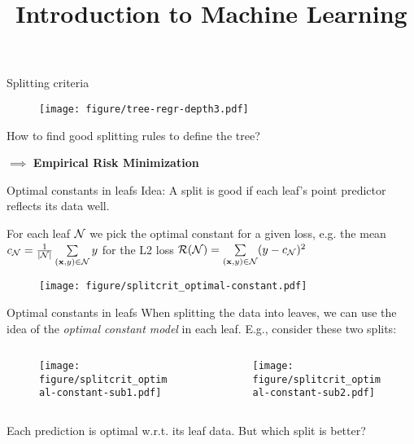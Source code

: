 \documentclass[11pt,compress,t,notes=noshow, xcolor=table]{beamer}
\title{Introduction to Machine Learning}
\institute{\href{https://compstat-lmu.github.io/lecture_i2ml/}{compstat-lmu.github.io/lecture\_i2ml}}
\date{}
\begin{document}
\sloppy


\begin{frame}{Splitting criteria}

 \begin{figure}
    \centering
      \texttt{[image: figure/tree-regr-depth3.pdf]}
    \end{figure}

How to find good splitting rules to define the tree?
\lz

$\implies$ \textbf{Empirical Risk Minimization}

\end{frame}

\begin{vbframe}{Optimal constants in leafs}
Idea: A split is good if each leaf's point predictor reflects its data well. 
\vspace{0.2cm}

For each leaf $\mathcal{N}$ we pick the optimal constant for a given loss, e.g. the mean $c_{\mathcal{N}} = \frac{1}{|\mathcal{N}|}\sum\limits_{(\mathbf{x}, y) \in \mathcal{N}} y$ for the L2 loss $\mathcal{R}(\mathcal{N}) = \sum\limits_{(\mathbf{x}, y) \in \mathcal{N}} (y - c_{\mathcal{N}})^2$

\begin{figure}
\texttt{[image: figure/splitcrit\_optimal-constant.pdf]} 
\end{figure}



\end{vbframe}



\begin{vbframe}{Optimal constants in leafs}
When splitting the data into leaves, we can use the idea of the \emph{optimal constant model} in each leaf. E.g., consider these two splits:

\begin{columns}
\begin{column}{0.5\textwidth}

\color{fgcolor}

\begin{figure}
\texttt{[image: figure/splitcrit\_optimal-constant-sub1.pdf]} 
\end{figure}

 
\end{column}
\begin{column}{0.5\textwidth}

\begin{figure}
\texttt{[image: figure/splitcrit\_optimal-constant-sub2.pdf]} 
\end{figure}

\end{column}
\end{columns}

Each prediction is optimal w.r.t. its leaf data. But which split is better?

\end{vbframe}
\end{document}
